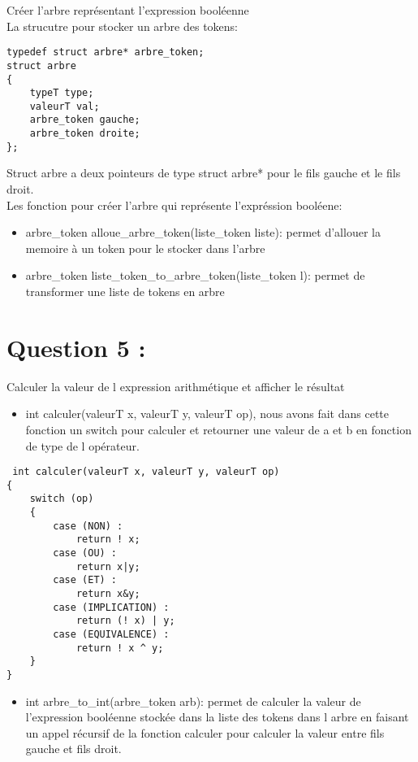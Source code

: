 \documentclass{article}
\begin{document}
Créer l'arbre représentant l'expression booléenne\\
La strucutre pour stocker un arbre des tokens: 
\begin{verbatim}
typedef struct arbre* arbre_token;
struct arbre
{
    typeT type;
    valeurT val;
    arbre_token gauche;
    arbre_token droite;
};
\end{verbatim}
Struct arbre a deux  pointeurs de type struct arbre* pour le fils gauche 
et le fils droit.\\
Les fonction pour créer l'arbre qui représente l'expréssion booléene: \\
\begin{itemize}
    \item arbre\_token alloue\_arbre\_token(liste\_token liste): permet d'allouer la memoire à un token pour le stocker dans l'arbre
    \item arbre\_token liste\_token\_to\_arbre\_token(liste\_token l): permet de transformer une liste de tokens en arbre 
\end{itemize}

\newpage
\section*{Question 5 :}
\vspace{5px}

Calculer la valeur de l expression arithmétique et afficher le résultat \\
\begin{itemize}
 \item int calculer(valeurT x, valeurT y, valeurT op), nous avons fait dans cette 
fonction un switch pour calculer et retourner une valeur  de a et b en fonction de 
type de l opérateur.
\end{itemize}
\begin{verbatim}
 int calculer(valeurT x, valeurT y, valeurT op)
{   
	switch (op)
	{ 
	    case (NON) :
	        return ! x;
	    case (OU) :
	        return x|y; 
	    case (ET) :
	        return x&y; 
	    case (IMPLICATION) :
	        return (! x) | y;
	    case (EQUIVALENCE) :
	        return ! x ^ y;
	}
} 
\end{verbatim}

\begin{itemize}
    \item int arbre\_to\_int(arbre\_token arb): permet de calculer la valeur de l'expression booléenne stockée dans la liste des tokens dans l arbre en faisant un appel récursif de la fonction calculer pour calculer la valeur entre fils gauche et fils droit.
\end{itemize}
 
\end{document}
